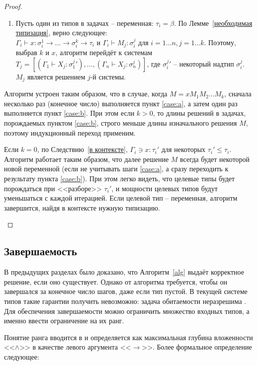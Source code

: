 \documentclass[../main.tex]{subfiles}
\begin{document}
\begin{proof}
\begin{enumerate}
\begin{enumerate}
            \item \label{case:b} Пусть один из типов в задачах -- переменная: $\tau_i = \beta$. По Лемме~\ref{необходимая типизация}, верно следующее: $\Gamma_i \vdash x \colon \sigma_i^1 \to \dots \to \sigma_i^k \to \tau_i \text{ и } \Gamma_i \vdash M_j \colon \sigma_i^j \text{ для } i = 1 \dots n, j = 1 \dots k$. 
            Поэтому, выбрав $k$ и $x$, алгоритм перейдёт к системам $T_j = [(\Gamma_1 \vdash X_j : \sigma_1^j') ,\dots, (\Gamma_n \vdash X_j : \sigma_n^j)]$, где $\sigma_i^j'$ -- некоторый надтип $\sigma_i^j$. $M_j$ является решением $j$-й системы.
        \end{enumerate}
        
        Алгоритм устроен таким образом, что в случае, когда $M = x M_1 M_2 \dots M_k$, сначала несколько раз (конечное число) выполняется пункт \ref{case:a}, а затем один раз выполняется пункт \ref{case:b}. При этом если $k > 0$, то длины решений в задачах, порождаемых пунктом \ref{case:b}, строго меньше длины изначального решения $M$, поэтому индукционный переход применим. 
        
        Если $k = 0$, по Следствию~\ref{в контексте}, $\Gamma_i \ni x \colon \tau_i'$ для некоторых $\tau_i' \leqslant \tau_i$. Алгоритм работает таким образом, что далее решение $M$ всегда будет некоторой новой переменной (если не учитывать шаги \ref{case:a}, а сразу переходить к результату пункта \ref{case:b}). При этом легко видеть, что целевые типы будет порождаться при <<разборе>> $\tau_i'$, и мощности целевых типов будут уменьшаться с каждой итерацией. Если целевой тип -- переменная, алгоритм завершится, найдя в контексте нужную типизацию.
        
\end{enumerate}

\end{proof}

\subsection{Завершаемость}
В предыдущих разделах было доказано, что Алгоритм~\ref{alg} выдаёт корректное решение, если оно существует. Однако от алгоритма требуется, чтобы он завершался за конечное число шагов, даже если тип пустой. В текущей системе типов такие гарантии получить невозможно: задача обитаемости неразрешима \cite{urzyczyn_1999}. 
Для обеспечения завершаемости можно ограничить множество входных типов, а именно ввести ограничение на их ранг. 

Понятие ранга вводится в \cite{leivant_1983} и определяется как максимальная глубина вложенности <<$\wedge$>> в качестве левого аргумента <<$\to$>>. Более формальное определение следующее:
\end{document}
